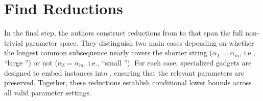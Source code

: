\section{Find Reductions}
In the final step, the authors construct reductions from \ov{} to \lcs{} that span the full non-trivial parameter space.  
They distinguish two main cases depending on whether the longest common subsequence nearly covers the shorter string ($\alpha_L = \alpha_m$, i.e., \enquote{large \lcs{}}) or not ($\alpha_\delta = \alpha_m$, i.e., \enquote{small \lcs{}}).  
For each case, specialized gadgets are designed to embed \ov{} instances into \lcs{}, ensuring that the relevant parameters are preserved.  
Together, these reductions establish conditional lower bounds across all valid parameter settings.








